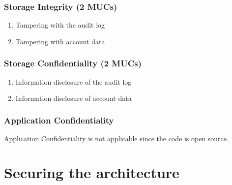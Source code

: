 \documentclass[a4paper,11pt]{report}
\begin{document}
\subsection{Storage Integrity (2 MUCs)}
\begin{enumerate}
\item Tampering with the audit log
\item Tampering with account data
\end{enumerate}

\subsection{Storage Confidentiality (2 MUCs)}
\begin{enumerate}
\item Information disclosure of the audit log
\item Information disclosure of account data 
\end{enumerate}

\subsection{Application Confidentiality}
Application Confidentiality is not applicable since the code is open source.

\chapter{Securing the architecture}
\end{document}
